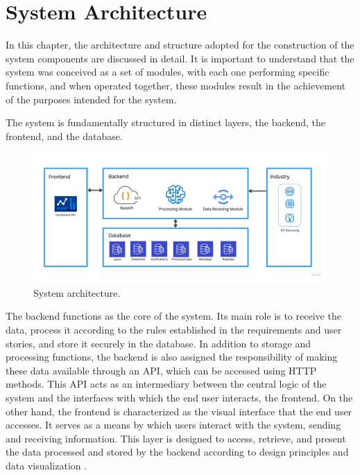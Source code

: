 \chapter{System Architecture}\label{cap:development}
In this chapter, the architecture and structure adopted for the construction of the system components are discussed in detail. It is important to understand that the system was conceived as a set of modules, with each one performing specific functions, and when operated together, these modules result in the achievement of the purposes intended for the system.

The system is fundamentally structured in distinct layers, the backend, the frontend, and the database.

\begin{figure}[htbp]
	\centering
	\includegraphics[scale=0.12]{images/Architecture.jpg}
	\caption{System architecture.}
	\label{fig:systemAchitectureImage}
\end{figure}

The backend functions as the core of the system. Its main role is to receive the data, process it according to the rules established in the requirements and user stories, and store it securely in the database. In addition to storage and processing functions, the backend is also assigned the responsibility of making these data available through an \gls{API}, which can be accessed using \gls{HTTP} methods. This \gls{API} acts as an intermediary between the central logic of the system and the interfaces with which the end user interacts, the frontend.
On the other hand, the frontend is characterized as the visual interface that the end user accesses. It serves as a means by which users interact with the system, sending and receiving information. This layer is designed to access, retrieve, and present the data processed and stored by the backend according to design principles and data visualization \cite{barbosa2019introduction}.

